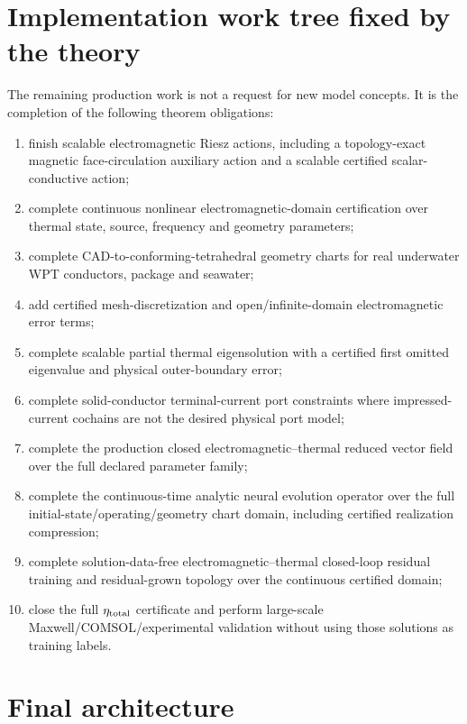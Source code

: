 \documentclass[11pt]{article}
\theoremstyle{remark}
\begin{document}
\section{Implementation work tree fixed by the theory}

The remaining production work is not a request for new model concepts. It is the completion of the following theorem obligations:
\begin{enumerate}
\item finish scalable electromagnetic Riesz actions, including a topology-exact magnetic face-circulation auxiliary action and a scalable certified scalar-conductive action;
\item complete continuous nonlinear electromagnetic-domain certification over thermal state, source, frequency and geometry parameters;
\item complete CAD-to-conforming-tetrahedral geometry charts for real underwater WPT conductors, package and seawater;
\item add certified mesh-discretization and open/infinite-domain electromagnetic error terms;
\item complete scalable partial thermal eigensolution with a certified first omitted eigenvalue and physical outer-boundary error;
\item complete solid-conductor terminal-current port constraints where impressed-current cochains are not the desired physical port model;
\item complete the production closed electromagnetic--thermal reduced vector field over the full declared parameter family;
\item complete the continuous-time analytic neural evolution operator over the full initial-state/operating/geometry chart domain, including certified realization compression;
\item complete solution-data-free electromagnetic--thermal closed-loop residual training and residual-grown topology over the continuous certified domain;
\item close the full \(\eta_{\rm total}\) certificate and perform large-scale Maxwell/COMSOL/experimental validation without using those solutions as training labels.
\end{enumerate}

\section{Final architecture}
\end{document}
